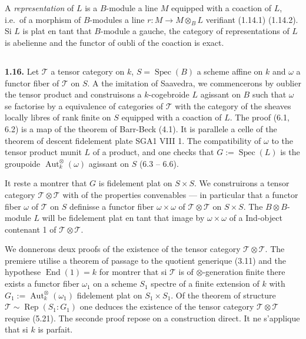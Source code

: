 \documentclass[12pt,a4paper]{article}
\theoremstyle{plain}
\theoremstyle{definition}
\theoremstyle{remark}
\DeclareMathOperator{\End}{End}
\DeclareMathOperator{\Aut}{Aut}
\DeclareMathOperator{\Spec}{Spec}
\DeclareMathOperator{\Rep}{Rep}
\begin{document}
A \emph{representation} of $L$ is a $B$-module a line $M$ equipped with a coaction of $L$, i.e.~of a morphism of $B$-modules a line $r : M \to M \otimes_B L$ verifiant (1.14.1) (1.14.2). Si $L$ is plat en tant that $B$-module a gauche, the category of representations of $L$ is abelienne and the functor of oubli of the coaction is exact.

\subsection{}

\textbf{1.16.} Let $\mathcal{T}$ a tensor category on $k$, $S = \Spec(B)$ a scheme affine on $k$ and $\omega$ a functor fiber of $\mathcal{T}$ on $S$. A the imitation of Saavedra, we commencerons by oublier the tensor product and construisons a $k$-cogebroide $L$ agissant on $B$ such that $\omega$ se factorise by a equivalence of categories of $\mathcal{T}$ with the category of the sheaves locally libres of rank finite on $S$ equipped with a coaction of $L$. The proof (6.1, 6.2) is a map of the theorem of Barr-Beck (4.1). It is parallele a celle of the theorem of descent fidelement plate SGA1 VIII 1. The compatibility of $\omega$ to the tensor product munit $L$ of a product, and one checks that $G := \Spec(L)$ is the groupoide $\Aut^\otimes_k(\omega)$ agissant on $S$ (6.3 -- 6.6).

It reste a montrer that $G$ is fidelement plat on $S \times S$. We construirons a tensor category $\mathcal{T} \otimes \mathcal{T}$ with of the properties convenables --- in particular that a functor fiber $\omega$ of $\mathcal{T}$ on $S$ definisse a functor fiber $\omega \times \omega$ of $\mathcal{T} \otimes \mathcal{T}$ on $S \times S$. The $B \otimes B$-module $L$ will be fidelement plat en tant that image by $\omega \times \omega$ of a Ind-object contenant 1 of $\mathcal{T} \otimes \mathcal{T}$.

We donnerons deux proofs of the existence of the tensor category $\mathcal{T} \otimes \mathcal{T}$. The premiere utilise a theorem of passage to the quotient generique (3.11) and the hypothese $\End(1) = k$ for montrer that si $\mathcal{T}$ is of $\otimes$-generation finite there exists a functor fiber $\omega_1$ on a scheme $S_1$ spectre of a finite extension of $k$ with $G_1 := \Aut^\otimes_k(\omega_1)$ fidelement plat on $S_1 \times S_1$. Of the theorem of structure $\mathcal{T} \sim \Rep(S_1:G_1)$ one deduces the existence of the tensor category $\mathcal{T} \otimes \mathcal{T}$ requise (5.21). The seconde proof repose on a construction direct. It ne s'applique that si $k$ is parfait.
\end{document}
